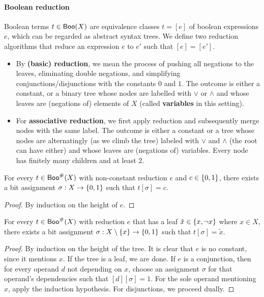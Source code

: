 \documentclass[a4paper]{memoir}
\begin{document}
\paragraph{Boolean reduction}
\begin{definition} \label{def:reduction}
	Boolean terms $t \in \mathsf{Boo}(X)$ are equivalence classes $t = [e]$ of boolean expressions $e$, which can be regarded as abstract syntax trees.
	We define two reduction algorithms that reduce an expression $e$ to $e'$ such that $[e] = [e']$.
	\begin{itemize}
		\item By \textbf{(basic) reduction}, we mean the process of pushing all negations to the leaves, eliminating double negations, and simplifying conjunctions/disjunctions with the constants $0$ and $1$.
		The outcome is either a constant, or a binary tree whose nodes are labelled with $\vee$ or $\wedge$ and whose leaves are (negations of) elements of $X$ (called \textbf{variables} in this setting).
		\item For \textbf{associative reduction}, we first apply reduction and subsequently merge nodes with the same label.
		The outcome is either a constant or a tree whose nodes are alternatingly (as we climb the tree) labeled with $\vee$ and $\wedge$ (the root can have either) and whose leaves are (negations of) variables.
		Every node has finitely many children and at least 2.
	\end{itemize}
\end{definition}
\begin{lemma} \label{thm:boolexp-to-const-assignment}
	For every $t \in \mathsf{Boo}^\#(X)$ with non-constant reduction $e$ and $c \in \mathopen{}\left\{ 0, 1 \right\}\mathclose{}$, there exists a bit assignment $\sigma : X \to \mathopen{}\left\{ 0, 1 \right\}\mathclose{}$ such that $t[\sigma] = c$.
\end{lemma}
\begin{proof}
	By induction on the height of $e$.
\end{proof}
\begin{lemma} \label{thm:boolexp-to-var-assignment}
	For every $t \in \mathsf{Boo}^\#(X)$ with reduction $e$ that has a leaf $\tilde x \in \mathopen{}\left\{ x,\lnot x \right\}\mathclose{}$ where $x \in X$, there exists a bit assignment $\sigma : X \setminus \mathopen{}\left\{ x \right\}\mathclose{} \to \mathopen{}\left\{ 0, 1 \right\}\mathclose{}$ such that $t[\sigma] = \tilde x$.
\end{lemma}
\begin{proof}
	By induction on the height of the tree.
	It is clear that $e$ is no constant, since it mentions $x$.
	If the tree is a leaf, we are done.
	If $e$ is a conjunction, then for every operand $d$ not depending on $x$, choose an assignment $\sigma$ for that operand's dependencies such that $[d][\sigma] = 1$.
	For the sole operand mentioning $x$, apply the induction hypothesis.
	For disjunctions, we proceed dually.
\end{proof}
\end{document}
